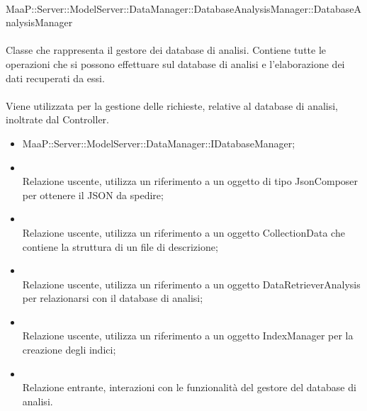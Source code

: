 \\
MaaP::Server::ModelServer::DataManager::DatabaseAnalysisManager::DatabaseAnalysisManager\\
\\
Classe che rappresenta il gestore dei database di analisi. Contiene tutte le operazioni che si possono effettuare sul database di analisi e l'elaborazione dei dati recuperati da essi.\\
\\
Viene utilizzata per la gestione delle richieste, relative al database di analisi, inoltrate dal Controller.
\begin{itemize}
\item MaaP::Server::ModelServer::DataManager::IDatabaseManager;
\end{itemize}
\begin{itemize}
\item{}\\
Relazione uscente, utilizza un riferimento a un oggetto di tipo JsonComposer per ottenere il JSON da spedire;
\item{}\\
Relazione uscente, utilizza un riferimento a un oggetto CollectionData che contiene la struttura di un file di descrizione;
\item{}\\
Relazione uscente, utilizza un riferimento a un oggetto DataRetrieverAnalysis per relazionarsi con il database di analisi;
\item{}\\
Relazione uscente, utilizza un riferimento a un oggetto IndexManager per la creazione degli indici;
\item{}\\
Relazione entrante, interazioni con le funzionalità del gestore del database di analisi.
\end{itemize}

